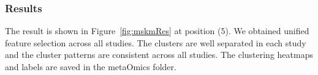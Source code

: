 \subsubsection{Results}

The result is shown in Figure~\ref{fig:mskmRes} at position {\color{red} (5)}.
We obtained unified feature selection across all studies.
The clusters are well separated in each study and the cluster patterns are consistent across all studies.
The clustering heatmaps and labels are saved in the metaOmics folder.











